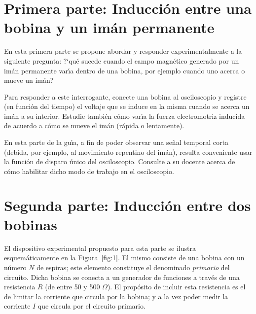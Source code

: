 \documentclass[laboratorio]{guia}
\begin{document}
 
\maketitle

\section{Primera parte: Inducci\'on entre una bobina y un im\'an permanente}

En esta primera parte se propone abordar y responder experimentalmente a la siguiente pregunta:
?`qu\'e sucede cuando el campo magn\'etico generado por un im\'an permanente
var\'\i a dentro de una bobina, por ejemplo cuando uno acerca o mueve un
im\'an? 

Para responder a este interrogante, conecte una bobina al osciloscopio y
registre (en funci\'on del tiempo) el voltaje que se induce en la misma cuando
se acerca un im\'an a su interior. Estudie tambi\'en c\'omo var\'\i a la fuerza
electromotriz inducida de acuerdo a c\'omo se mueve el im\'an (r\'apida o
lentamente). 

En esta parte de la gu\'\i a, a fin de poder observar una se\~nal temporal
corta (debida, por ejemplo, al movimiento repentino del im\'an), resulta
conveniente usar la funci\'on de disparo \'unico del osciloscopio. Consulte a
su docente acerca de c\'omo habilitar dicho modo de trabajo en el osciloscopio.

\section{Segunda parte: Inducci\'on entre dos bobinas}

El dispositivo experimental propuesto para esta parte se ilustra
esquem\'aticamente en la Figura~\ref{fig:1}. El mismo consiste de una bobina
con un n\'umero $N$ de espiras; este elemento constituye el denominado {\it
primario} del circuito. Dicha bobina se conecta a un generador de funciones a
trav\'es de una resistencia $R$ (de entre 50 y 500 $\Omega$). El prop\'osito de
incluir esta resistencia es el de limitar la corriente que circula por la
bobina; y a la vez poder medir la corriente $I$ que circula por el circuito
primario. 
\end{document}
